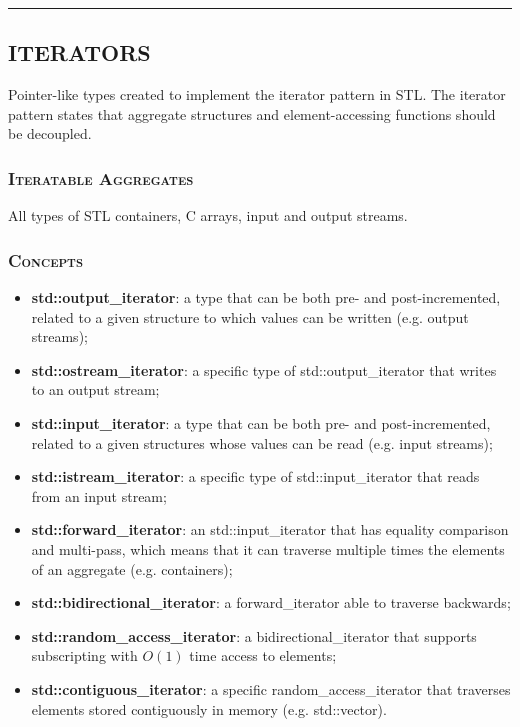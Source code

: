 \documentclass[10pt]{article}
\begin{document}
\begin{multicols*}{5}
\par\noindent\rule{155pt}{0.4pt}

{\color{Blue}
\subsection*{ITERATORS}	
\noindent
Pointer-like types created to implement the iterator pattern in STL. The iterator pattern states that aggregate structures and element-accessing functions should be decoupled.

\subsubsection*{\textsc{Iteratable Aggregates}} 
\noindent
All types of STL containers, C arrays, input and output streams.

\subsubsection*{\textsc{Concepts}} 
\begin{itemize}[leftmargin=*,topsep=0.25pt]
  \setlength\itemsep{.3pt}
	\item \textbf{std::output\_iterator}: a type that can be both pre- and post-incremented, related to a given structure to which values can be written (e.g. output streams);
	\item \textbf{std::ostream\_iterator}: a specific type of std::out\-put\_i\-te\-ra\-tor that writes to an output stream;
	\item \textbf{std::input\_iterator}: a type that can be both pre- and post-incremented, related to a given structures whose values can be read (e.g. input streams);
	\item \textbf{std::istream\_iterator}: a specific type of std::in\-put\_i\-te\-ra\-tor that reads from an input stream;
	\item \textbf{std::forward\_iterator}: an std::input\_iterator that has equality comparison and multi-pass, which means that it can traverse multiple times the elements of an aggregate (e.g. containers); 
	\item \textbf{std::bidirectional\_iterator}: a forward\_iterator able to traverse backwards; 
	\item \textbf{std::random\_access\_iterator}: a bidirectional\_iterator that supports subscripting with $O(1)$ time access to elements; 
	\item \textbf{std::contiguous\_iterator}: a specific ran\-dom\_ac\-cess\_i\-te\-ra\-tor that traverses elements stored contiguously in memory (e.g. std::vector). 
\end{itemize}

}
\end{multicols*}
\end{document}
